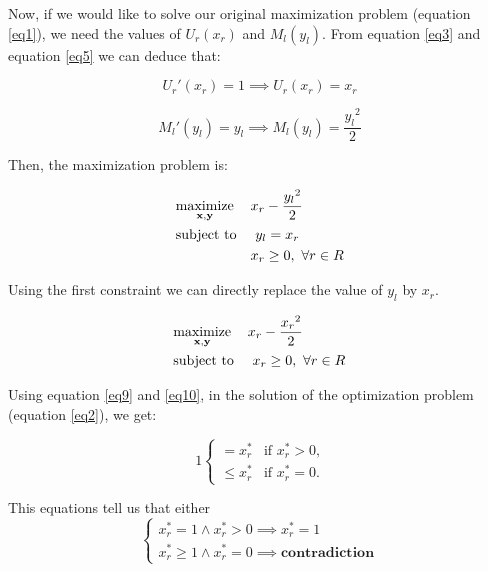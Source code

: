Now, if we would like to solve our original maximization problem (equation \eqref{eq1}), we need the values of $U_{r}(x_{r})$ and $M_{l}(y_{l})$.
From equation \eqref{eq3} and equation \eqref{eq5} we can deduce that:

\begin{equation}
U_{r}'(x_r) = 1 \implies U_{r}(x_r)=x_r
\label{eq9}
\end{equation}

\begin{equation}
M_l'(y_l) = y_l \implies M_{l}(y_l)=\frac{{y_l}^2}{2}
\label{eq10}
\end{equation}

Then, the maximization problem is:

\begin{equation}
\begin{aligned}
& \underset{\mathbf{x}, \mathbf{y}}{\text{maximize}}
& &  x_{r} - \frac{{y_l}^2}{2}\\
& \text{subject to}
& & \ y_l=x_r \\
&      &&  x_{r} \geq 0,\ \forall r \in R\\
\end{aligned}
\label{eq11}
\end{equation}

Using the first constraint we can directly replace the value of $y_l$ by $x_r$.

\begin{equation}
\begin{aligned}
& \underset{\mathbf{x}, \mathbf{y}}{\text{maximize}}
& &  x_r - \frac{{x_r}^2}{2}\\
& \text{subject to} & & \ x_{r} \geq 0,\ \forall r \in R\\
\end{aligned}
\label{eq12}
\end{equation}

Using equation \eqref{eq9} and \eqref{eq10}, in the solution of the optimization problem (equation \eqref{eq2}), we get:

\begin{equation}
\ 1
\begin{cases}
= x^*_r  & \mbox{if } x^*_{r} > 0,\\ 
\leq x^*_r & \mbox{if } x^*_{r} = 0.
\end{cases}
\label{eq13}
\end{equation}

This equations tell us that either 
$$\begin{cases}
x^*_r = 1 \land x^*_r > 0  \implies x^*_r = 1\\
x^*_r \geq 1 \land x^*_r = 0 \implies \textbf{contradiction}
\end{cases}$$

